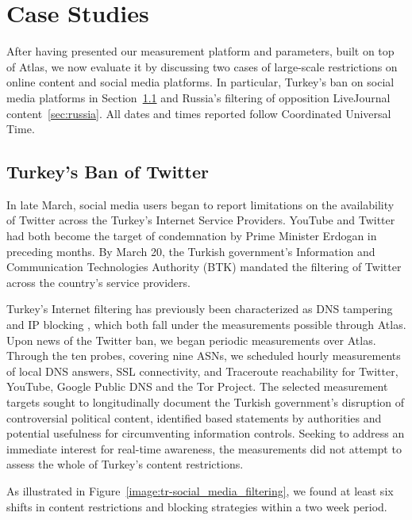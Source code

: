\section{Case Studies}
\label{sec:case_studies}

After having presented our measurement platform and parameters, built on top of
Atlas, we now evaluate it by discussing two cases of large-scale
restrictions on online content and social media platforms.  In particular, Turkey's ban on social media platforms in
Section~\ref{sec:turkey} and Russia's filtering of opposition LiveJournal content~\ref{sec:russia}. All dates and times reported follow Coordinated Universal Time.


\subsection{Turkey's Ban of Twitter}
\label{sec:turkey}

In late March, social media users began to report limitations on the
availability of Twitter across the Turkey's Internet Service Providers.
YouTube and Twitter had both become the target of condemnation by Prime Minister
Erdogan in preceding months. By March 20, the Turkish government's Information
and Communication Technologies Authority (BTK) mandated the filtering of
Twitter across the country's service providers.

Turkey's Internet filtering has previously been characterized as DNS tampering and
IP blocking \cite{akdeniz2010report}, which both fall under the measurements
possible through Atlas.  Upon news of the Twitter ban, we began periodic
measurements over Atlas.  Through the ten probes, covering nine ASNs, we
scheduled hourly measurements of local DNS answers, SSL connectivity, and
Traceroute reachability for Twitter, YouTube, Google Public DNS and the Tor
Project.  The selected measurement targets sought to longitudinally
document the Turkish government's disruption of controversial political
content, identified based statements by authorities and potential usefulness for
circumventing information controls. Seeking to address an immediate interest for real-time
awareness, the measurements did not attempt to assess the whole of Turkey's content
restrictions.

As illustrated in Figure~\ref{image:tr-social_media_filtering}, we
found at least six shifts in content restrictions and blocking strategies
within a two week period.

